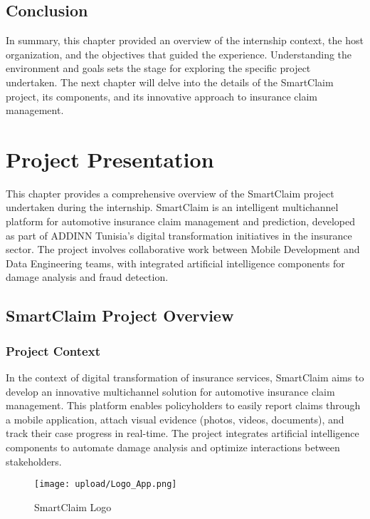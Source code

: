 \documentclass[12pt,a4paper]{report}
\begin{document}
\section*{Conclusion}
In summary, this chapter provided an overview of the internship context, the host organization, and the objectives that guided the experience. Understanding the environment and goals sets the stage for exploring the specific project undertaken. The next chapter will delve into the details of the SmartClaim project, its components, and its innovative approach to insurance claim management.

\chapter{Project Presentation}

This chapter provides a comprehensive overview of the SmartClaim project undertaken during the internship. SmartClaim is an intelligent multichannel platform for automotive insurance claim management and prediction, developed as part of ADDINN Tunisia's digital transformation initiatives in the insurance sector. The project involves collaborative work between Mobile Development and Data Engineering teams, with integrated artificial intelligence components for damage analysis and fraud detection.

\section{SmartClaim Project Overview}

\subsection{Project Context}

In the context of digital transformation of insurance services, SmartClaim aims to develop an innovative multichannel solution for automotive insurance claim management. This platform enables policyholders to easily report claims through a mobile application, attach visual evidence (photos, videos, documents), and track their case progress in real-time. The project integrates artificial intelligence components to automate damage analysis and optimize interactions between stakeholders.

\begin{figure}[H]
    \centering
    \texttt{[image: upload/Logo\_App.png]}
    \caption{SmartClaim Logo}
    \label{fig:SmartClaim}
\end{figure}
\end{document}
